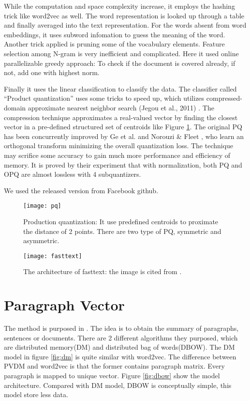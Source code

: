 While the computation and space complexity increase, it employs the hashing trick like word2vec as well. 
The word representation is looked up through a table and finally averaged into the text representation. 
For the words absent from word embeddings, it uses subword infomation\cite{bojanowski2016enriching} to guess the meaning of the word.
Another trick applied is pruning some of the vocabulary elements. Feature selection among N-gram is very inefficient and complicated.
Here it used online parallelizable greedy approach: To check if the document is covered already, if not, add one with highest norm.

Finally it uses the linear classification to classify the data. The classifier called \enquote{Product quantization} uses some tricks to speed up, which utilizes compressed-domain approximate nearest neighbor search (Jegou et al., 2011) \cite{jegou2011searching}.
The compression technique approximates a real-valued vector by finding the closest vector in a pre-defined structured set of centroids like Figure \ref{fig:pq}.
The original PQ has been concurrently improved by Ge et al. \cite{ge2013optimized} and Norouzi \& Fleet , who learn an orthogonal transform minimizing the overall quantization loss.
The technique may scrifice some accuracy to gain much more performance and efficiency of memory. It is proved by their experiment that with normalization, both PQ and OPQ are almost lossless with 4 subquantizers. 

We used the released version from Facebook github.

\begin{figure}[h]
    \centering
	\texttt{[image: pq]}
    \caption{Production quantization: It use predefined centroids to proximate the distance of 2 points. There are two type of PQ, symmetric and asymmetric. }
    \label{fig:pq}
\end{figure}

\begin{figure}[h]
    \centering
	\texttt{[image: fasttext]}
    \caption{The architecture of fasttext: the image is cited from \cite{joulin2016fasttext}.}
    \label{fig:fasttext}
\end{figure}


\section{Paragraph Vector}
	
The method is purposed in \cite{PVDM}. The idea is to obtain the summary of paragraphs, sentences or documents. 
There are 2 different algorithms they purposed, which are distributed memory(DM) and distributed bag of words(DBOW). 
The DM model in figure \ref{fig:dm} is quite similar with word2vec. The difference between PVDM and word2vec is that the former contains paragraph matrix.
Every paragraph is mapped to unique vector. Figure \ref{fig:dbow} show the model architecture. Compared with DM model, DBOW is conceptually simple, this model store less data. 

